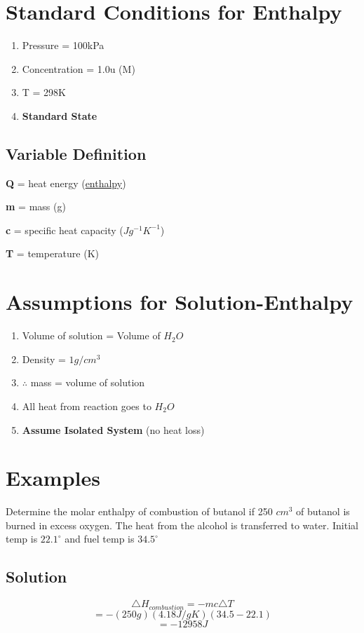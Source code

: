 \documentclass[12pt]{article} %
\begin{document}
\section{Standard Conditions for Enthalpy}

\begin{enumerate}
\item Pressure = 100kPa
\item Concentration = 1.0u (M)
\item T = 298K
\item \textbf{Standard State}
\end{enumerate}


\subsection{Variable Definition}
\textbf{Q} = heat energy (\underline{enthalpy})

\textbf{m} = mass (g)

\textbf{c} = specific heat capacity ($Jg^{-1}K^{-1}$)

\textbf{T} = temperature (K)


\section{Assumptions for Solution-Enthalpy}

\begin{enumerate}
\item Volume of solution = Volume of $H_2O$
\item Density = $1g/cm^3$
\item $\therefore$ mass = volume of solution
\item All heat from reaction goes to $H_2O$
\item \textbf{Assume Isolated System} (no heat loss)
\end{enumerate}

\pagebreak

\section{Examples}

Determine the molar enthalpy of combustion of butanol if 250 $cm^3$ of butanol is burned in excess oxygen. The heat from the alcohol is transferred to water. Initial temp is $22.1^\circ$ and fuel temp is $34.5^\circ$
\singlespace

\subsection*{Solution}
$$\triangle{H}_{combustion} = -mc\triangle{T}$$
$$ = -(250g)(4.18J/gK)(34.5 - 22.1)$$
$$ = -12958J$$
\end{document}
